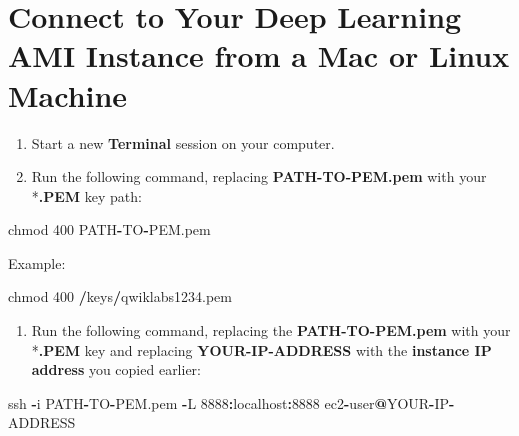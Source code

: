 \documentclass[]{book}
\newenvironment{Shaded}{\begin{snugshade}}{\end{snugshade}}
\newcommand{\DecValTok}[1]{\textcolor[rgb]{0.00,0.00,0.81}{#1}}
\newcommand{\OperatorTok}[1]{\textcolor[rgb]{0.81,0.36,0.00}{\textbf{#1}}}
\newcommand{\NormalTok}[1]{#1}
\providecommand{\tightlist}{%
  \setlength{\itemsep}{0pt}\setlength{\parskip}{0pt}}
\begin{document}
\hypertarget{connect-to-your-deep-learning-ami-instance-from-a-mac-or-linux-machine}{%
\section{Connect to Your Deep Learning AMI Instance from a Mac or Linux Machine}\label{connect-to-your-deep-learning-ami-instance-from-a-mac-or-linux-machine}}

\begin{enumerate}
\def\labelenumi{\arabic{enumi}.}
\setcounter{enumi}{75}
\tightlist
\item
  Start a new \textbf{Terminal} session on your computer.
\item
  Run the following command, replacing \textbf{PATH-TO-PEM.pem} with your *\textbf{.PEM} key path:
\end{enumerate}

\begin{Shaded}
\begin{Highlighting}[]
\NormalTok{chmod }\DecValTok{400}\NormalTok{ PATH}\OperatorTok{-}\NormalTok{TO}\OperatorTok{-}\NormalTok{PEM.pem }
\end{Highlighting}
\end{Shaded}

Example:

\begin{Shaded}
\begin{Highlighting}[]
\NormalTok{chmod }\DecValTok{400} \OperatorTok{/}\NormalTok{keys}\OperatorTok{/}\NormalTok{qwiklabs1234.pem }
\end{Highlighting}
\end{Shaded}

\begin{enumerate}
\def\labelenumi{\arabic{enumi}.}
\setcounter{enumi}{77}
\tightlist
\item
  Run the following command, replacing the \textbf{PATH-TO-PEM.pem} with your *\textbf{.PEM} key and replacing \textbf{YOUR-IP-ADDRESS} with the \textbf{instance IP address} you copied earlier:
\end{enumerate}

\begin{Shaded}
\begin{Highlighting}[]
\NormalTok{ssh }\OperatorTok{-}\NormalTok{i PATH}\OperatorTok{-}\NormalTok{TO}\OperatorTok{-}\NormalTok{PEM.pem }\OperatorTok{-}\NormalTok{L }\DecValTok{8888}\OperatorTok{:}\NormalTok{localhost}\OperatorTok{:}\DecValTok{8888} 
\NormalTok{ec2}\OperatorTok{-}\NormalTok{user}\OperatorTok{@}\NormalTok{YOUR}\OperatorTok{-}\NormalTok{IP}\OperatorTok{-}\NormalTok{ADDRESS }
\end{Highlighting}
\end{Shaded}
\end{document}
